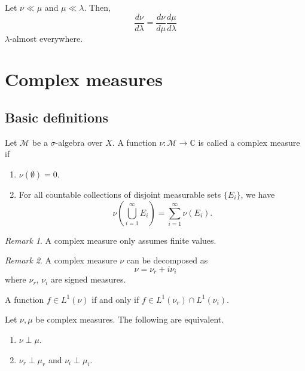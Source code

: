 \documentclass[11pt]{article}
\renewcommand{\C}{\mathbb{C}}
\newcommand{\M}{\mathcal{M}}
\theoremstyle{definition}
\theoremstyle{remark}
\newtheorem*{remark}{Remark}
\begin{document}
    \begin{lemma}
        Let $\nu \ll \mu$ and $\mu \ll \lambda$. Then, \[
            \frac{d\nu}{d\lambda} = \frac{d\nu}{d\mu} \frac{d\mu}{d\lambda}
        \] $\lambda$-almost everywhere.
    \end{lemma}



    \section{Complex measures}

    \subsection{Basic definitions}

    \begin{definition}
        Let $\M$ be a $\sigma$-algebra over $X$. A function $\nu\colon \M \to
        \C$ is called a complex measure if \begin{enumerate}
            \item $\nu(\emptyset) = 0$.
            \item For all countable collections of disjoint measurable sets
            $\{E_i\}$, we have \[
                \nu\left(\bigcup_{i = 1}^\infty E_i\right) = \sum_{i = 1}^\infty
                \nu(E_i).
            \]
        \end{enumerate}
        \begin{remark}
            A complex measure only assumes finite values.
        \end{remark}
        \begin{remark}
            A complex measure $\nu$ can be decomposed as \[
                \nu = \nu_r + i \nu_i
            \] where $\nu_r$, $\nu_i$ are signed measures.
        \end{remark}
    \end{definition}

    \begin{definition}
        A function $f \in L^1(\nu)$ if and only if $f \in L^1(\nu_r) \cap
        L^1(\nu_i)$.
    \end{definition}

    \begin{lemma}
        Let $\nu, \mu$ be complex measures. The following are equivalent.
        \begin{enumerate}
            \item $\nu \perp \mu$.
            \item $\nu_r \perp \mu_r$ and $\nu_i \perp \mu_i$.
        \end{enumerate}
    \end{lemma}
\end{document}

